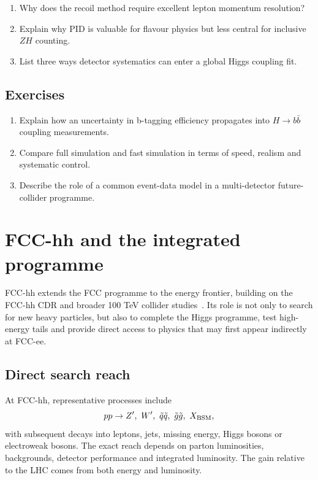 \documentclass[11pt,a4paper]{article}
\numberwithin{equation}{section}
\begin{document}
\begin{guidedchecksbox}
\begin{enumerate}[leftmargin=1.6em]
\item Why does the recoil method require excellent lepton momentum resolution?
\item Explain why PID is valuable for flavour physics but less central for inclusive \(ZH\) counting.
\item List three ways detector systematics can enter a global Higgs coupling fit.
\end{enumerate}
\end{guidedchecksbox}

\subsection{Exercises}
\begin{enumerate}[leftmargin=1.6em]
\item Explain how an uncertainty in b-tagging efficiency propagates into \(H\to b\bar b\) coupling measurements.
\item Compare full simulation and fast simulation in terms of speed, realism and systematic control.
\item Describe the role of a common event-data model in a multi-detector future-collider programme.
\end{enumerate}


\newpage
\section{FCC-hh and the integrated programme}
\begin{guidelinebox}
FCC-hh extends the FCC programme to the energy frontier, building on the FCC-hh CDR and broader 100 TeV collider studies~\cite{FCCCDRVol3,ArkaniHamed100TeV2016,ManganoFCChh2017}. Its role is not only to search for new heavy particles, but also to complete the Higgs programme, test high-energy tails and provide direct access to physics that may first appear indirectly at FCC-ee.
\end{guidelinebox}

\subsection{Direct search reach}
At FCC-hh, representative processes include
\begin{equation}
  pp\to Z',\ W',\ \tilde q\tilde q,\ \tilde g\tilde g,\ X_{\rm BSM},
\end{equation}
with subsequent decays into leptons, jets, missing energy, Higgs bosons or electroweak bosons. The exact reach depends on parton luminosities, backgrounds, detector performance and integrated luminosity. The gain relative to the LHC comes from both energy and luminosity.
\end{document}
